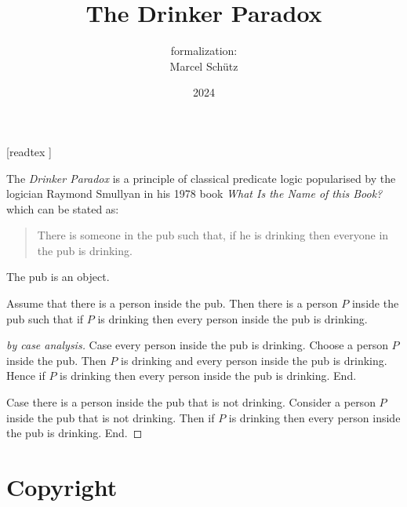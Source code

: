\documentclass{article}
\title{The Drinker Paradox}
\author{\Naproche formalization:\\[0.5em]Marcel Schütz}
\date{2024}
\begin{document}
  \maketitle

  \begin{imports}
    \begin{forthel}
      [readtex ]
    \end{forthel}
  \end{imports}

  \noindent The \emph{Drinker Paradox} is a principle of classical predicate 
  logic popularised by the logician Raymond Smullyan in his 1978 book
  \textit{What Is the Name of this Book?} \cite{Smullyan1978} which can be 
  stated as:

  \begin{quotation}
    \noindent There is someone in the pub such that, if he is drinking then 
    everyone in the pub is drinking.
  \end{quotation}

  \begin{forthel}
    \begin{signature*}
      The pub is an object.
    \end{signature*}
    
    \begin{theorem*}[title=Drinker Paradox,id=drinker_paradox]
      Assume that there is a person inside the pub.
      Then there is a person $P$ inside the pub such that if $P$ is drinking then every person inside the pub is drinking.
    \end{theorem*}
    \begin{proof}[by case analysis]
      Case every person inside the pub is drinking.
        Choose a person $P$ inside the pub.
        Then $P$ is drinking and every person inside the pub is drinking.
        Hence if $P$ is drinking then every person inside the pub is drinking.
      End.
    
      Case there is a person inside the pub that is not drinking.
        Consider a person $P$ inside the pub that is not drinking.
        Then if $P$ is drinking then every person inside the pub is drinking.
      End.
    \end{proof}
  \end{forthel}

  \printbibliography

  \section*{Copyright}
  \doclicenseThis
\end{document}
